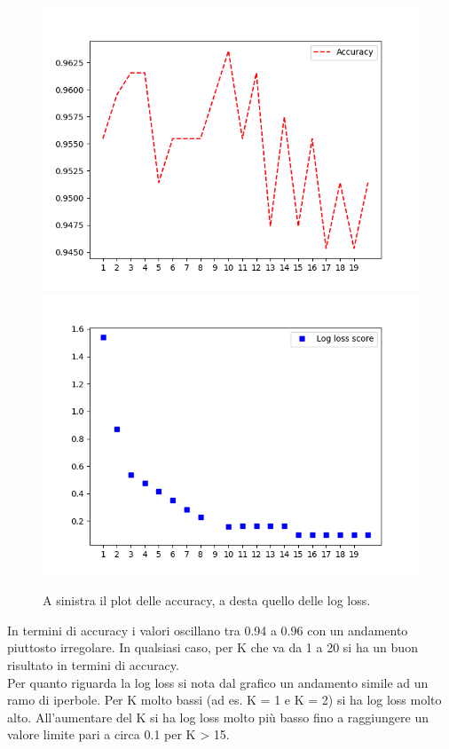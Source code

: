 \begin{figure}[!htb]
	\includegraphics[width=1.2\linewidth]{image/plot_accuracy.png}
	\label{fig:immagine01}
	\endminipage\hfill
	\includegraphics[width=1.2\linewidth]{image/plot_logloss.png}
	\label{fig:immagine2}
	\endminipage
	\caption{A sinistra il plot delle accuracy, a desta quello delle log loss.}
\end{figure}
In termini di accuracy i valori oscillano tra 0.94 a 0.96 con un andamento piuttosto irregolare. In qualsiasi caso, per K che va da 1 a 20 si ha un buon risultato in termini di accuracy.\\
Per quanto riguarda la log loss si nota dal grafico un andamento simile ad un ramo di iperbole. Per K molto bassi (ad es. K = 1 e K = 2) si ha log loss molto alto. All'aumentare del K si ha log loss molto più basso fino a raggiungere un valore limite pari a circa 0.1 per K > 15.
